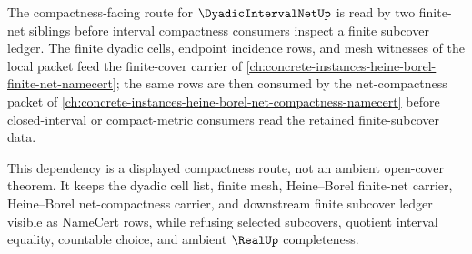 The compactness-facing route for $\DyadicIntervalNetUp$ is read by two finite-net siblings before interval compactness consumers inspect a finite subcover ledger. The finite dyadic cells, endpoint incidence rows, and mesh witnesses of the local packet feed the finite-cover carrier of \autoref{ch:concrete-instances-heine-borel-finite-net-namecert}; the same rows are then consumed by the net-compactness packet of \autoref{ch:concrete-instances-heine-borel-net-compactness-namecert} before closed-interval or compact-metric consumers read the retained finite-subcover data.

This dependency is a displayed compactness route, not an ambient open-cover theorem. It keeps the dyadic cell list, finite mesh, Heine--Borel finite-net carrier, Heine--Borel net-compactness carrier, and downstream finite subcover ledger visible as NameCert rows, while refusing selected subcovers, quotient interval equality, countable choice, and ambient $\RealUp$ completeness.
